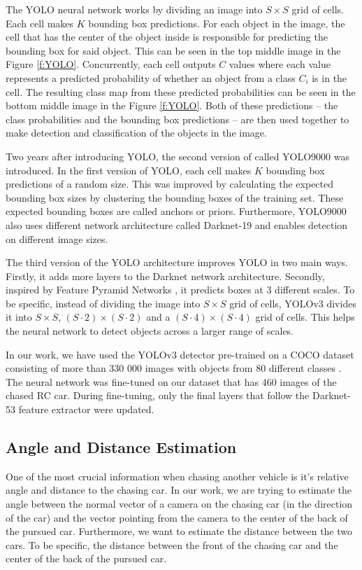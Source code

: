 The YOLO neural network works by dividing an image into $S\times S$ grid of cells. Each cell makes $K$ bounding box predictions. For each object in the image, the cell that has the center of the object inside is responsible for predicting the bounding box for said object. This can be seen in the top middle image in the Figure \ref{f:YOLO}. Concurrently, each cell outputs $C$ values where each value represents a predicted probability of whether an object from a class $C_i$ is in the cell. The resulting class map from these predicted probabilities can be seen in the bottom middle image in the Figure \ref{f:YOLO}. Both of these predictions -- the class probabilities and the bounding box predictions -- are then used together to make detection and classification of the objects in the image.
\par


Two years after introducing YOLO, the second version of called YOLO9000 \cite{YOLO9000} was introduced. In the first version of YOLO, each cell makes $K$ bounding box predictions of a random size. This was improved by calculating the expected bounding box sizes by clustering the bounding boxes of the training set. These expected bounding boxes are called anchors or priors. Furthermore, YOLO9000 also uses different network architecture called Darknet-19 and enables detection on different image sizes. \par


The third version of the YOLO architecture improves YOLO in two main ways. Firstly, it adds more layers to the Darknet network architecture. Secondly, inspired by Feature Pyramid Networks \cite{FPN}, it predicts boxes at 3 different scales. To be specific, instead of dividing the image into $S\times S$ grid of cells, YOLOv3 divides it into $S\times S$, $(S\cdot2)\times (S\cdot2)$ and a $(S\cdot4)\times (S\cdot4)$ grid of cells. This helps the neural network to detect objects across a larger range of scales.


In our work, we have used the YOLOv3 detector pre-trained on a COCO dataset consisting of more than 330 000 images with objects from 80 different classes \cite{COCO_dataset}. The neural network was fine-tuned on our dataset that has 460 images of the chased RC car. During fine-tuning, only the final layers that follow the Darknet-53 feature extractor were updated.




\subsection{Angle and Distance Estimation}
One of the most crucial information when chasing another vehicle is it's relative angle and distance to the chasing car. In our work, we are trying to estimate the angle between the normal vector of a camera on the chasing car (in the direction of the car) and the vector pointing from the camera to the center of the back of the pursued car. Furthermore, we want to estimate the distance between the two cars. To be specific, the distance between the front of the chasing car and the center of the back of the pursued car. \par


